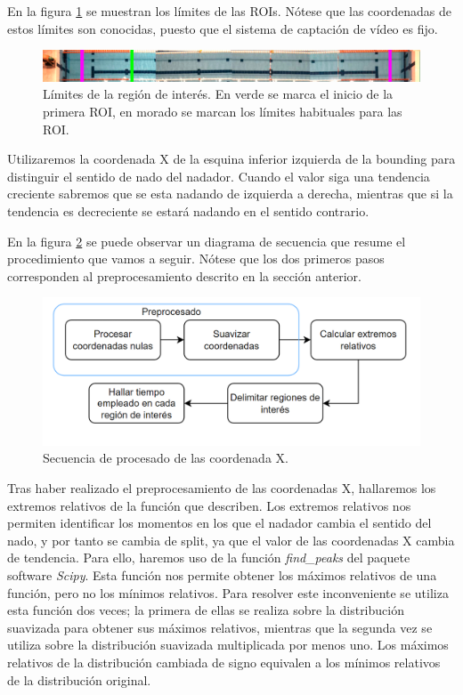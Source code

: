 En la figura \ref{fig:limitesroi} se muestran los límites de las ROIs. Nótese que las coordenadas de estos límites son conocidas, puesto que el sistema de captación de vídeo es fijo.

\begin{figure}
    \centering
    \includegraphics[width=\textwidth,height=\textheight,keepaspectratio]{imagenes/parte_graficas/limites_ROI.png}
    \caption{Límites de la región de interés. En verde se marca el inicio de la primera ROI, en morado se marcan los límites habituales para las ROI.}
    \label{fig:limitesroi}
\end{figure}

Utilizaremos la coordenada X de la esquina inferior izquierda de la bounding para distinguir el sentido de nado del nadador. Cuando el valor siga una tendencia creciente sabremos que se esta nadando de izquierda a derecha, mientras que si la tendencia es decreciente se estará nadando en el sentido contrario.

En la figura \ref{fig:diagramasecuenciacoordenadasX} se puede observar un diagrama de secuencia que resume el procedimiento que vamos a seguir. Nótese que los dos primeros pasos corresponden al preprocesamiento descrito en la sección anterior.

\begin{figure}
    \centering
    \includegraphics[width=\textwidth,height=\textheight,keepaspectratio]{imagenes/parte_graficas/Coordenada X.png}
    \caption{Secuencia de procesado de las coordenada X.}
    \label{fig:diagramasecuenciacoordenadasX}
\end{figure}

Tras haber realizado el preprocesamiento de las coordenadas X, hallaremos los extremos relativos de la función que describen. Los extremos relativos nos permiten identificar los momentos en los que el nadador cambia el sentido del nado, y por tanto se cambia de split, ya que el valor de las coordenadas X cambia de tendencia. Para ello, haremos uso de la función \textit{find\_peaks} del paquete software \textit{Scipy}. Esta función nos permite obtener los máximos relativos de una función, pero no los mínimos relativos. Para resolver este inconveniente se utiliza esta función dos veces; la primera de ellas se realiza sobre la distribución suavizada para obtener sus máximos relativos, mientras que la segunda vez se utiliza sobre la distribución suavizada multiplicada por menos uno. Los máximos relativos de la distribución cambiada de signo equivalen a los mínimos relativos de la distribución original. 


